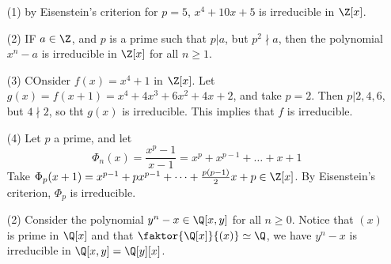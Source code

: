 \begin{example}\label{example_3.6}
    \begin{enumerate}
        \item[(1)] by Eisenstein's criterion for $p=5$,  $x^4+10x+5$ is
            irreducible in  $\Z[x]$.

        \item[(2)] IF $a \in \Z$, and  $p$ is a prime such that  $p|a$, but $p^2
            \nmid a$, then the polynomial $x^n-a$ is irreducible in  $\Z[x]$ for
            all $n \geq 1$.

        \item[(3)] COnsider $f(x)=x^4+1$ in $\Z[x]$. Let
            $g(x)=f(x+1)=x^4+4x^3+6x^2+4x+2$, and take $p=2$. Then  $p|2,4,6$, but
            $4 \nmid 2$, so tht  $g(x)$ is irreducible. This implies that $f$ is
            irreducible.

        \item[(4)] Let $p$ a prime, and let
            \begin{equation*}
                \Phi_n(x)=\frac{x^p-1}{x-1}=x^p+x^{p-1}+\dots+x+1
            \end{equation*}
            Take $\Phi_p(x+1)=x^{p-1}+px^{p-1}+\dots+\frac{p(p-1)}{2}x+p \in \Z[x]$.
            By Eisenstein's criterion, $\Phi_p$ is irreducible.

        \item[(2)] Consider the polynomial $y^n-x \in \Q[x,y]$ for all $n \geq
            0$. Notice that  $(x)$ is prime in $\Q[x]$ and that
            $\faktor{\Q[x]}{(x)} \simeq \Q$, we have $y^n-x$ is irreducible in
            $\Q[x,y]=\Q[y][x]$.

    \end{enumerate}
\end{example}
